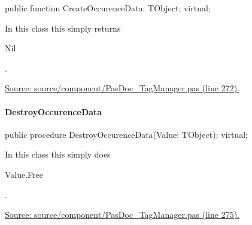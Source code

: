 \documentclass{report}
\newif\ifpdf
\begin{document}
\label{PasDoc_TagManager.TTag-CreateOccurenceData}
\begin{list}{}{
\setlength{\itemindent}{0cm}
\setlength{\listparindent}{0cm}
\setlength{\leftmargin}{\evensidemargin}
\addtolength{\leftmargin}{\tmplength}
\settowidth{\labelsep}{X}
\addtolength{\leftmargin}{\labelsep}
\setlength{\labelwidth}{\tmplength}
}
\item[\textbf{Declaration}\hfill]
\ifpdf
\begin{flushleft}
\fi
\begin{ttfamily}
public function CreateOccurenceData: TObject; virtual;\end{ttfamily}

\ifpdf
\end{flushleft}
\fi

\par
\item[\textbf{Description}]
In this class this simply returns \begin{ttfamily}Nil\end{ttfamily}.\par
\href{https://github.com/pasdoc/pasdoc/blob/master/source/component/PasDoc_TagManager.pas#L272}{Source: source/component/PasDoc{\_}TagManager.pas (line 272).}

\end{list}
\paragraph*{DestroyOccurenceData}\hspace*{\fill}

\label{PasDoc_TagManager.TTag-DestroyOccurenceData}
\begin{list}{}{
\setlength{\itemindent}{0cm}
\setlength{\listparindent}{0cm}
\setlength{\leftmargin}{\evensidemargin}
\addtolength{\leftmargin}{\tmplength}
\settowidth{\labelsep}{X}
\addtolength{\leftmargin}{\labelsep}
\setlength{\labelwidth}{\tmplength}
}
\item[\textbf{Declaration}\hfill]
\ifpdf
\begin{flushleft}
\fi
\begin{ttfamily}
public procedure DestroyOccurenceData(Value: TObject); virtual;\end{ttfamily}

\ifpdf
\end{flushleft}
\fi

\par
\item[\textbf{Description}]
In this class this simply does \begin{ttfamily}Value.Free\end{ttfamily}.\par
\href{https://github.com/pasdoc/pasdoc/blob/master/source/component/PasDoc_TagManager.pas#L275}{Source: source/component/PasDoc{\_}TagManager.pas (line 275).}

\end{list}
\ifpdf
\end{document}

